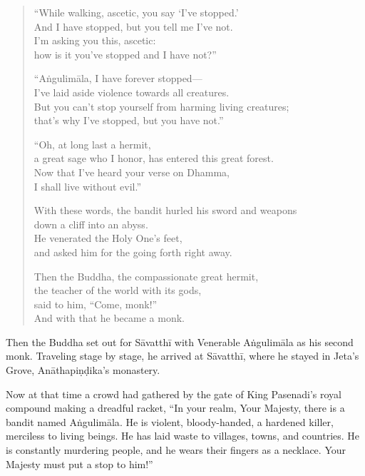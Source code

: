 \documentclass[12pt,openany]{book}%
\begin{document}
\begin{verse}%
“While walking, ascetic, you say ‘I’ve stopped.’ \\
And I have stopped, but you tell me I’ve not. \\
I’m asking you this, ascetic: \\
how is it you’ve stopped and I have not?” 

“\textsanskrit{Aṅgulimāla}, I have forever stopped—\\
I’ve laid aside violence towards all creatures. \\
But you can’t stop yourself from harming living creatures; \\
that’s why I’ve stopped, but you have not.” 

“Oh, at long last a hermit, \\
a great sage who I honor, has entered this great forest. \\
Now that I’ve heard your verse on Dhamma, \\
I shall live without evil.” 

With these words, the bandit hurled his sword and weapons \\
down a cliff into an abyss. \\
He venerated the Holy One’s feet, \\
and asked him for the going forth right away. 

Then the Buddha, the compassionate great hermit, \\
the teacher of the world with its gods, \\
said to him, “Come, monk!” \\
And with that he became a monk. 

%
\end{verse}

Then the Buddha set out for \textsanskrit{Sāvatthī} with Venerable \textsanskrit{Aṅgulimāla} as his second monk. Traveling stage by stage, he arrived at \textsanskrit{Sāvatthī}, where he stayed in Jeta’s Grove, \textsanskrit{Anāthapiṇḍika}’s monastery. 

Now at that time a crowd had gathered by the gate of King Pasenadi’s royal compound making a dreadful racket, “In your realm, Your Majesty, there is a bandit named \textsanskrit{Aṅgulimāla}. He is violent, bloody-handed, a hardened killer, merciless to living beings. He has laid waste to villages, towns, and countries. He is constantly murdering people, and he wears their fingers as a necklace. Your Majesty must put a stop to him!” 
\end{document}
